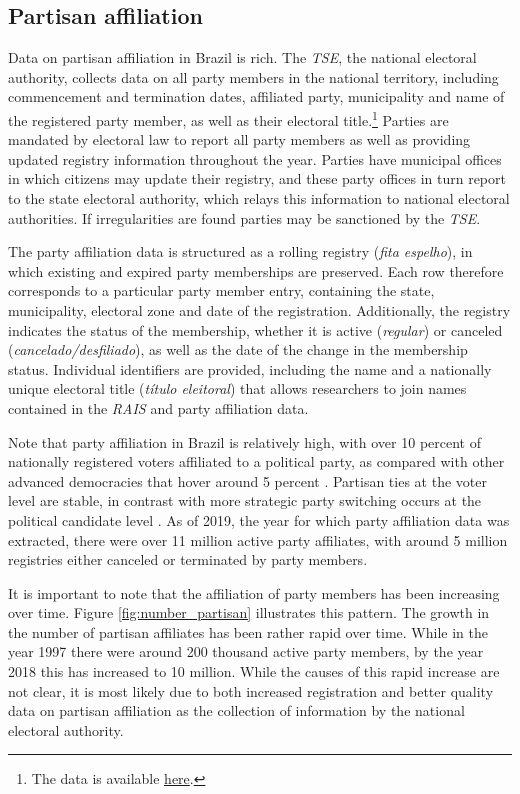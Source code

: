 \documentclass[12pt,a4paper]{article}
\begin{document}
\subsection{Partisan affiliation}

Data on partisan affiliation in Brazil is rich. The \emph{TSE}, the national electoral authority, collects data on all party members in the national territory, including commencement and termination dates, affiliated party, municipality and name of the registered party member, as well as their electoral title.\footnote{The data is available \href{https://filia-consulta.tse.jus.br/}{here}.} Parties are mandated by electoral law to report all party members as well as providing updated registry information throughout the year. Parties have municipal offices in which citizens may update their registry, and these party offices in turn report to the state electoral authority, which relays this information to national electoral authorities. If irregularities are found parties may be sanctioned by the \emph{TSE}.

The party affiliation data is structured as a rolling registry (\emph{fita espelho}), in which existing and expired party memberships are preserved. Each row therefore corresponds to a particular party member entry, containing the state, municipality, electoral zone and date of the registration. Additionally, the registry indicates the status of the membership, whether it is active (\emph{regular}) or canceled (\emph{cancelado/desfiliado}), as well as the date of the change in the membership status. Individual identifiers are provided, including the name and a nationally unique electoral title (\emph{t\'{i}tulo eleitoral}) that allows researchers to join names contained in the \emph{RAIS} and party affiliation data.

Note that party affiliation in Brazil is relatively high, with over 10 percent of nationally registered voters affiliated to a political party, as compared with other advanced democracies that hover around 5 percent \citep{speck2015estudo}. Partisan ties at the voter level are stable, in contrast with more strategic party switching occurs at the political candidate level \citep{desposato2006parties}. As of 2019, the year for which party affiliation data was extracted, there were over 11 million active party affiliates, with around 5 million registries either canceled or terminated by party members.

It is important to note that the affiliation of party members has been increasing over time. Figure \ref{fig:number_partisan} illustrates this pattern. The growth in the number of partisan affiliates has been rather rapid over time. While in the year 1997 there were around 200 thousand active party members, by the year 2018 this has increased to 10 million. While the causes of this rapid increase are not clear, it is most likely due to both increased registration and better quality data on partisan affiliation as the collection of information by the national electoral authority.
\end{document}
